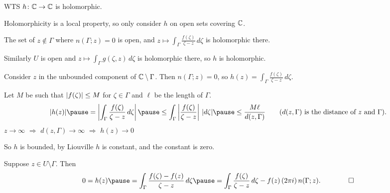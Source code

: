 \documentclass[10pt,aspectratio=169]{beamer}
\begin{document}
\begin{frame}
WTS $h \colon {\mathbb{C}} \to {\mathbb{C}}$ is holomorphic.

\medskip
\pause

Holomorphicity is a local property, so only consider $h$ on open sets
covering ${\mathbb{C}}$.

\medskip
\pause

The set of $z \notin \Gamma$ where $n(\Gamma;z) = 0$ is open, and 
$\displaystyle z \mapsto \int_\Gamma \frac{f(\zeta)}{\zeta-z} \, d\zeta$ is
holomorphic there.

\medskip
\pause

Similarly $U$ is open and $\displaystyle
z \mapsto
\int_\Gamma g(\zeta,z) \, d\zeta$ is holomorphic there, so $h$ is
holomorphic.

\medskip
\pause

Consider $z$ in the unbounded component of
${\mathbb{C}} \setminus \Gamma$.
\pause
Then $n(\Gamma;z) = 0$, so
$h(z) = 
\int_\Gamma \frac{f(\zeta)}{\zeta-z} \, d\zeta$.

\medskip
\pause

Let $M$ be such that
$\lvert {f(\zeta)} \rvert \leq M$ for $\zeta \in \Gamma$ and
\pause
$\ell$ be the length of
$\Gamma$.
\pause
\[
\sabs{h(z)}
\pause
=
\abs{
\int_\Gamma \frac{f(\zeta)}{\zeta-z} \, d\zeta
}
\pause
\leq
\int_\Gamma \abs{\frac{f(\zeta)}{\zeta-z}} \, \sabs{d\zeta}
\pause
\leq
\frac{M \ell}{d(z,\Gamma)}
\qquad \text{($d(z,\Gamma)$ is the distance of $z$ and $\Gamma$).}
\]
\pause
$z \to \infty$ \quad $\Rightarrow$ \quad $d(z,\Gamma) \to \infty$ \quad
$\Rightarrow$ \quad $h(z) \to 0$

\medskip
\pause

So $h$ is bounded, by Liouville $h$ is constant, and the constant is zero.

\medskip
\pause

Suppose $z \in U \setminus \Gamma$.  Then
\[
0 = h(z)
\pause
=
\int_\Gamma \frac{f(\zeta)-f(z)}{\zeta-z} \, d\zeta
\pause
=
\int_\Gamma \frac{f(\zeta)}{\zeta-z} \, d\zeta
-
f(z) \, (2\pi i) \, n(\Gamma;z) . \qquad \qed
\]

\end{frame}
\end{document}
